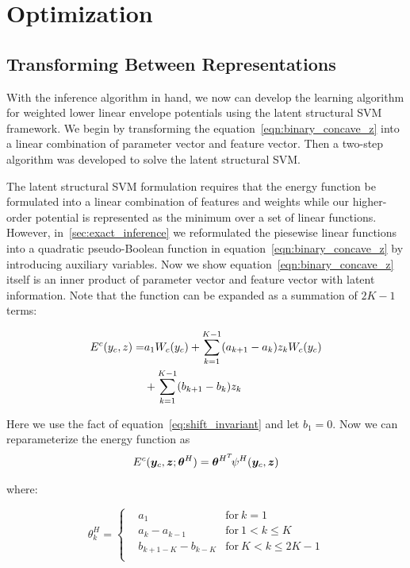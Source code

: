 \section{Optimization}
\label{sec:opt}

\subsection{Transforming Between Representations}
\label{sec:learning}
With the inference algorithm in hand, we now can develop the
learning algorithm for weighted lower linear envelope potentials
using the latent structural SVM framework. We begin by
transforming the equation~\eqref{eqn:binary_concave_z} into a
linear combination of parameter vector and feature vector. Then a
two-step algorithm was developed to solve the latent structural
SVM.

The latent structural SVM formulation requires that the energy
function be formulated into a linear combination of features and
weights while our higher-order potential is represented as the
minimum over a set of linear functions. However,
in~\ref{sec:exact_inference} we reformulated the piesewise linear
functions into a quadratic pseudo-Boolean
function in equation~\eqref{eqn:binary_concave_z} by introducing auxiliary
variables. Now we show equation~\eqref{eqn:binary_concave_z}
itself is an inner product of parameter vector and feature vector
with latent information. Note that the function can be expanded
as a summation of $2K-1$ terms:

\begin{align}
  \label{eq:originalenergy}
  E^c(y_c,z)
  =&a_1W_c(y_c)+\sum_{k=1}^{K-1}(a_{k+1}-a_k)z_kW_c(y_c) \notag \\
   &+\sum_{k=1}^{K-1}(b_{k+1}-b_k)z_k
\end{align}

Here we use the fact of equation~\eqref{eq:shift_invariant} and
let $b_1=0$. Now we can reparameterize the energy function
as
\begin{align}
  \label{eq:llsvm_innerprod_energy}
  E^c({\bm{y}}_c,{\bm{z}}; {\bm{\theta}}^H) = {\bm{\theta}}^{H^T} \! \psi^H({\bm{y}}_c,{\bm{z}})
\end{align}

\noindent where:

\begin{equation}
\label{eq:llsvm_param}
  \theta_k^H = \left\{
    \begin{aligned}
      & a_1	& \text{for} \ k=1\\
      & a_k-a_{k-1} & \text{for}\ 1< k \leq K\\
      & b_{k+1-K}-b_{k-K} & \text{for} \ K<k\le2K-1\\
    \end{aligned}
  \right.
\end{equation}


